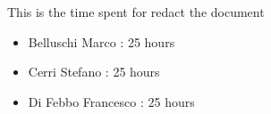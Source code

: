 This is the time spent for redact the document
\begin{itemize}
	\item Belluschi Marco : 25 hours
	\item Cerri Stefano : 25 hours
	\item Di Febbo Francesco : 25 hours
\end{itemize}
